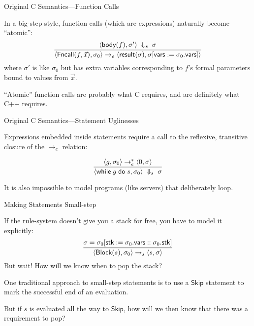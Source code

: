 \documentclass[compress,dvips,color=usenames,xcolor=dvipsnames]{beamer}
\newcommand{\cpp}{\mbox{C\hspace{-.1em}+\hspace{-.05em}+}}
\newcommand{\strong}[1]{{\structcol #1}}
\newcommand{\structcol}{\usebeamercolor[fg]{structure}}
\begin{document}
\begin{frame}{Original C Semantics---Function Calls}

  In a big-step style, function calls (which are expressions)
  naturally become ``atomic'':
  \[
  \infer{
    \langle \textsf{Fncall}(f,\vec{x}), \sigma_0 \rangle \rightarrow_e
    \langle \textsf{result}(\sigma),
    \sigma[\textsf{vars} := \sigma_0.\textsf{vars}]
    \rangle
  }{
    \langle \textsf{body}(f), \sigma'\rangle \;\Downarrow_s\; \sigma
  }
\]
where $\sigma'$ is like $\sigma_0$ but has extra variables
corresponding to $f$'s formal parameters bound to values from
$\vec{x}$.

\bigskip
``Atomic'' function calls are probably what C requires, and are
\strong{definitely} what \cpp{} requires.


\end{frame}

\begin{frame}{Original C Semantics---Statement Uglinesses}

  Expressions embedded inside statements require a call to the
  reflexive, transitive closure of the $\rightarrow_e$ relation:

\[
\infer{
  \langle\textsf{while}\;g \;\textsf{do}\;s,\sigma_0\rangle
  \;\Downarrow_s\;
  \sigma
}{
  \langle g, \sigma_0 \rangle \rightarrow_e^* \langle 0, \sigma\rangle
}
\]

\bigskip It is also impossible to model programs (like servers) that
deliberately loop.

\end{frame}

\begin{frame}{Making Statements Small-step}

If the rule-system doesn't give you a stack for free, you have to
model it explicitly:
\[
\infer{
  \langle \textsf{Block}(s), \sigma_0 \rangle \rightarrow_s
  \langle s, \sigma\rangle
}{
  \sigma =
  \sigma_0[\textsf{stk} := \sigma_0.\textsf{vars} :: \sigma_0.\textsf{stk}]
}
\]
But wait!  How will we know when to pop the stack?

\bigskip
One traditional approach to small-step statements is to use a
$\textsf{Skip}$ statement to mark the successful end of an
evaluation.

\bigskip But if $s$ is evaluated all the way to $\textsf{Skip}$,
how will we then know that there was a requirement to pop?

\end{frame}
\end{document}
